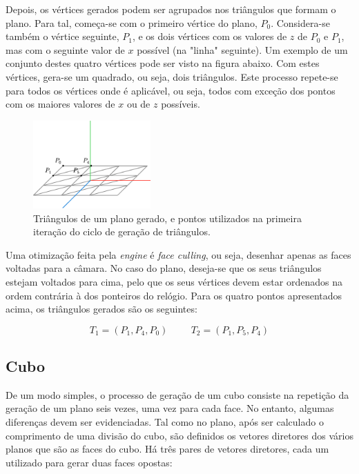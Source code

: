 \documentclass[12pt, a4paper]{article}
\begin{document}
Depois, os vértices gerados podem ser agrupados nos triângulos que formam o plano. Para tal,
começa-se com o primeiro vértice do plano, $P_0$. Considera-se também o vértice seguinte, $P_1$, e
os dois vértices com os valores de $z$ de $P_0$ e $P_1$, mas com o seguinte valor de $x$ possível
(na "linha"{} seguinte). Um exemplo de um conjunto destes quatro vértices pode ser visto na figura
abaixo. Com estes vértices, gera-se um quadrado, ou seja, dois triângulos. Este processo repete-se
para todos os vértices onde é aplicável, ou seja, todos com exceção dos pontos com os maiores
valores de $x$ ou de $z$ possíveis.

\begin{figure}[H]
    \centering
    \includegraphics[width=0.4\textwidth]{res/figures/PlaneTriangles.pdf}
    \caption{
        \onehalfspacing
        Triângulos de um plano gerado, e pontos utilizados na primeira iteração do ciclo de geração
        de triângulos.
    }
\end{figure}

Uma otimização feita pela \emph{engine} é \emph{face culling}, ou seja, desenhar apenas as faces
voltadas para a câmara. No caso do plano, deseja-se que os seus triângulos estejam voltados para
cima, pelo que os seus vértices devem estar ordenados na ordem contrária à dos ponteiros do
relógio. Para os quatro pontos apresentados acima, os triângulos gerados são os seguintes:

$$
T_1 = (P_1, P_4, P_0)
\hspace{1cm}
T_2 = (P_1, P_5, P_4)
$$

\subsection{Cubo}

De um modo simples, o processo de geração de um cubo consiste na repetição da geração de um plano
seis vezes, uma vez para cada face. No entanto, algumas diferenças devem ser evidenciadas. Tal como
no plano, após ser calculado o comprimento de uma divisão do cubo, são definidos os vetores
diretores dos vários planos que são as faces do cubo. Há três pares de vetores diretores, cada um
utilizado para gerar duas faces opostas:
\end{document}
